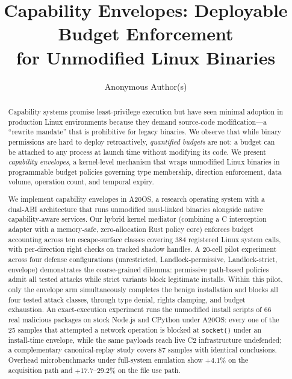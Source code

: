 \documentclass[letterpaper,twocolumn,10pt]{article}
\title{Capability Envelopes: Deployable Budget Enforcement\\for Unmodified Linux Binaries}
\author{Anonymous Author(s)}
\date{}
\begin{document}
\maketitle

\begin{abstract}
Capability systems promise least-privilege execution but have seen
minimal adoption in production Linux environments because they demand
source-code modification---a ``rewrite mandate'' that is prohibitive for
legacy binaries.  We observe that while binary permissions are hard to
deploy retroactively, \emph{quantified budgets} are not: a budget can be
attached to any process at launch time without modifying its code.  We
present \emph{capability envelopes}, a kernel-level mechanism that wraps
unmodified Linux binaries in programmable budget policies governing type
membership, direction enforcement, data volume, operation count, and
temporal expiry.

We implement capability envelopes in A20OS, a research operating system
with a dual-ABI architecture that runs unmodified musl-linked binaries
alongside native capability-aware services.  Our hybrid kernel mediator
(combining a C interception adapter with a memory-safe, zero-allocation
Rust policy core) enforces budget accounting across ten escape-surface
classes covering 384 registered Linux system calls, with per-direction
right checks on tracked shadow handles.
A 20-cell pilot experiment across four defense configurations
(unrestricted, Landlock-permissive, Landlock-strict, envelope)
demonstrates the coarse-grained dilemma: permissive path-based policies
admit all tested attacks while strict variants block legitimate installs.
Within this pilot, only the envelope arm simultaneously completes the
benign installation and blocks all four tested attack classes, through
type denial, rights clamping, and budget exhaustion.  An
exact-execution experiment runs the unmodified install scripts of 66
real malicious packages on stock Node.js and CPython under A20OS:
every one of the 25 samples that attempted a network operation is
blocked at \texttt{socket()} under an install-time envelope, while the
same payloads reach live C2 infrastructure undefended; a complementary
canonical-replay study covers 87 samples with identical conclusions.
Overhead microbenchmarks under full-system emulation show $+4.1\%$ on
the acquisition path and $+17.7$--$29.2\%$ on the file use path.
\end{abstract}

\end{document}
